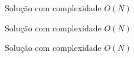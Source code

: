 \begin{frame}[fragile]{Solução com complexidade $O(N)$}
\end{frame}

\begin{frame}[fragile]{Solução com complexidade $O(N)$}
\end{frame}

\begin{frame}[fragile]{Solução com complexidade $O(N)$}
\end{frame}
